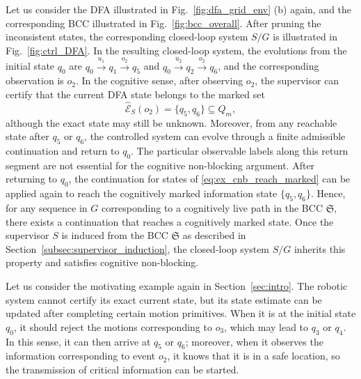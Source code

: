 \documentclass[final,5p,times,twocolumn,authoryear]{elsarticle}
\begin{document}
\begin{example}\label{ex:DFA_cnb}
    Let us consider the DFA illustrated in Fig.~\ref{fig:dfa_grid_env} (b) again, and the corresponding BCC illustrated in Fig.~\ref{fig:bcc_overall}.
    After pruning the inconsistent states, the corresponding closed-loop system $S / G$ is illustrated in Fig.~\ref{fig:ctrl_DFA}.
    In the resulting closed-loop system, the evolutions from the initial state $q_0$ are $q_0 \xrightarrow{u_1} q_1 \xrightarrow{o_2} q_5$ and $q_0 \xrightarrow{u_2} q_2 \xrightarrow{o_2} q_6$, and the corresponding observation is $o_2$.
    In the cognitive sense, after observing $o_2$, the supervisor can certify that the current DFA state belongs to the marked set
    \begin{equation}\label{eq:ex_cnb_reach_marked}
        \hat{\mathcal{E}}_S(o_2) = \{ q_5, q_6 \} \subseteq Q_m,
    \end{equation}
    although the exact state may still be unknown.
    Moreover, from any reachable state after $q_5$ or $q_6$, the controlled system can evolve through a finite admissible continuation and return to $q_0$.
    The particular observable labels along this return segment are not essential for the cognitive non-blocking argument.
    After returning to $q_0$, the continuation for states of \eqref{eq:ex_cnb_reach_marked} can be applied again to reach the cognitively marked information state $\{ q_5, q_6 \}$.
    Hence, for any sequence in $G$ corresponding to a cognitively live path in the BCC $\mathfrak{S}$, there exists a continuation that reaches a cognitively marked state.
    Once the supervisor $S$ is induced from the BCC $\mathfrak{S}$ as described in Section~\ref{subsec:supervisor_induction}, the closed-loop system $S/G$ inherits this property and satisfies cognitive non-blocking.
    
    Let us consider the motivating example again in Section~\ref{sec:intro}.
    The robotic system cannot certify its exact current state, but its state estimate can be updated after completing certain motion primitives.
    When it is at the initial state $q_0$, it should reject the motions corresponding to $o_3$, which may lead to $q_3$ or $q_4$.
    In this sense, it can then arrive at $q_5$ or $q_6$; moreover, when it observes the information corresponding to event $o_2$, it knows that it is in a safe location, so the transmission of critical information can be started.
\end{example}
\end{document}
